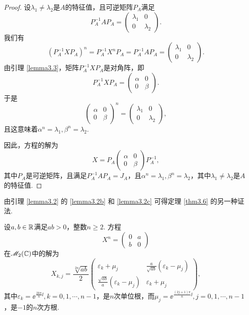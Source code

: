 \begin{proof}
  设$\lambda_1\ne\lambda_2$是$A$的特征值，且可逆矩阵$P_A$满足
  \[
    P_A^ {-1}AP_A=\begin{pmatrix}
      \lambda_1 & 0 \\
      0 & \lambda_2
    \end{pmatrix}.
  \]
  我们有
  \[
    (P_A^{-1}XP_A)^n = P_A^{-1}X^nP_A = P_A^{-1}AP_A = \begin{pmatrix}
      \lambda_1 & 0 \\
      0 & \lambda_2
    \end{pmatrix}.
  \]
  由引理 \ref{lemma3.3}，矩阵$P_A^{-1}XP_A$是对角阵，即
  \[
    P_A^{-1}XP_A = \begin{pmatrix}
      \alpha & 0 \\
      0 & \beta
    \end{pmatrix}.
  \]
  于是
  \[
    \begin{pmatrix}
      \alpha & 0 \\
      0 & \beta
    \end{pmatrix}^n =
    \begin{pmatrix}
      \lambda_1 & 0 \\
      0 & \lambda_2
    \end{pmatrix},
  \]
  且这意味着$\alpha^n=\lambda_1,\beta^n=\lambda_2$.

  因此，方程的解为
  \[
    X = P_A\begin{pmatrix}
      \alpha & 0 \\
      0 & \beta
    \end{pmatrix} P_A^{-1},
  \]
  其中$P_A$是可逆矩阵，且满足$P_A^{-1}AP_A=J_A$，且$\alpha^n=\lambda_1,\beta^n=\lambda_2$，其中$\lambda_1\ne\lambda_2$是$A$的特征值.
\end{proof}

由引理 \ref{lemma3.2} 的 \ref{lemma3.2b} 和 \ref{lemma3.2c} 可得定理 \ref{thm3.6} 的另一种证法.

\begin{mybox}
  \begin{corollary}

    设$a,b\in\mathbb R$满足$ab>0$，整数$n\ge2$. 方程
    \[
      X^n = \begin{pmatrix}
        0 & a \\
        b & 0
      \end{pmatrix}
    \]
    在$\mathscr M_2(\mathbb C)$中的解为
    \[
      X_{k,j} = \frac{\sqrt[2n]{ab}}2 \begin{pmatrix}
        \varepsilon_k + \mu_j & \frac a{\sqrt{ab}}(\varepsilon_k - \mu_j) \\
        \frac{\sqrt{ab}}a (\varepsilon_k - \mu_j) & \varepsilon_k + \mu_j
      \end{pmatrix},
    \]
    其中$\varepsilon_k=\ee^{\frac{2k\pi}n\ii}
    ,k=0,1,\cdots,n-1$，是$n$次单位根，而$\mu_j=\ee^{\frac{(2j+1)\pi}n\ii},
    j=0,1,\cdots,n-1$，是$-1$的$n$次方根.
  \end{corollary}
\end{mybox}

